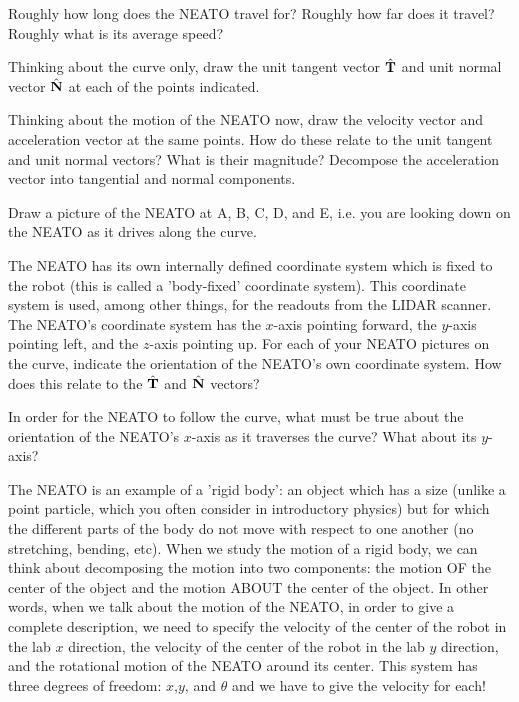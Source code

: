 \documentclass{tufte-handout}
\begin{document}
\be
\item Roughly how long does the NEATO travel for? Roughly how far does it travel? Roughly what is its average speed? 
\item Thinking about the curve only, draw the unit tangent vector $\hat{\mathbf{T}}$ and unit normal vector $\hat{\mathbf{N}}$ at each of the points indicated.
\item Thinking about the motion of the NEATO now, draw the velocity vector and acceleration vector at the same points. How do these relate to the unit tangent and unit normal vectors? What is their magnitude? Decompose the acceleration vector into tangential and normal components.
\item Draw a picture of the NEATO at A, B, C, D, and E, i.e. you are looking down on the NEATO as it drives along the curve.
\item  The NEATO has its own internally defined coordinate system which is fixed to the robot (this is called a 'body-fixed' coordinate system).  This coordinate system is used, among other things, for the readouts from the LIDAR scanner.  The NEATO's coordinate system has the $x$-axis pointing forward, the $y$-axis pointing left, and the $z$-axis pointing up.  For each of your NEATO pictures on the curve, indicate the orientation of the NEATO's own coordinate system.  How does this relate to the $\hat{\mathbf{T}}$ and $\hat{\mathbf{N}}$ vectors?
\item  In order for the NEATO to follow the curve, what must be true about the orientation of the NEATO's $x$-axis as it traverses the curve? What about its $y$-axis?
\item  The NEATO is an example of a 'rigid body':  an object which has a size (unlike a point particle, which you often consider in introductory physics) but for which the different parts of the body do not move with respect to one another (no stretching, bending, etc).  When we study the motion of a rigid body, we can think about decomposing the motion into two components:  the motion OF the center of the object and the motion ABOUT the center of the object.  In other words, when we talk about the motion of the NEATO, in order to give a complete description, we need to specify the velocity of the center of the robot in the lab $x$ direction, the velocity of the center of the robot in the lab $y$ direction, and the rotational motion of the NEATO around its center. This system has three degrees of freedom:  $x$,$y$, and $\theta$ and we have to give the velocity for each!

\be
\end{document}
